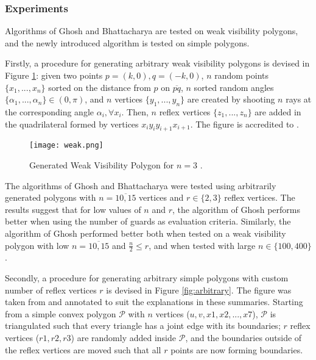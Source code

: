 \subsubsection{Experiments}
Algorithms of Ghosh \cite{GHOSH2010718} and Bhattacharya \cite{bhattacharya2016approximability} are tested on weak visibility polygons, and the newly introduced algorithm is tested on simple polygons. 

Firstly, a procedure for generating arbitrary weak visibility polygons is devised in Figure \ref{fig:weak}: given two points $p = (k, 0), q = (-k, 0)$,  $n$ random points $\{x_1, ..., x_n\}$ sorted on the distance from $p$ on $\overline{pq}$, $n$ sorted random angles $\{\alpha_1, ..., \alpha_n\} \in  (0, \pi)$, and $n$ vertices $\{y_1, ..., y_n\}$ are created by shooting $n$ rays at the corresponding angle $\alpha_i, \forall x_i$. Then, $n$ reflex vertices $\{z_1, ..., z_n\}$ are added in the quadrilateral formed by vertices $x_iy_iy_{i + 1}x_{i + 1}$. The figure is accredited to \cite{maleki2022implementation}.

\begin{figure}[h!]
    \centering
    \texttt{[image: weak.png]}
    \caption{Generated Weak Visibility Polygon for $n = 3$ \cite{maleki2022implementation}.}
    \label{fig:weak}
\end{figure}

The algorithms of Ghosh \cite{GHOSH2010718} and Bhattacharya \cite{bhattacharya2016approximability} were tested using arbitrarily generated polygons with $n = \overline{10, 15}$ vertices and $r \in \{2, 3\}$ reflex vertices. The results suggest that for low values of $n$ and $r$, the algorithm of Ghosh \cite{GHOSH2010718} performs better when using the number of guards as evaluation criteria. 
Similarly, the algorithm of Ghosh \cite{GHOSH2010718} performed better both when tested on a weak visibility polygon with low $n = \overline{10, 15}$ and $\frac n 2 \leq r$, and when tested with large $n \in \{100, 400\}$.

Secondly, a procedure for generating arbitrary simple polygons with custom number of reflex vertices $r$ is devised in Figure \ref{fig:arbitrary}. The figure was taken from \cite{maleki2022implementation} and annotated to suit the explanations in these summaries. Starting from a simple convex polygon $\mathcal P$ with $n$ vertices ($u, v, x1, x2, ..., x7$), $\mathcal P$ is triangulated such that every triangle has a joint edge with its boundaries; $r$ reflex vertices ($r1, r2, r3$) are randomly added inside $\mathcal P$, and the boundaries outside of the reflex vertices are moved such that all $r$ points are now forming boundaries. 

